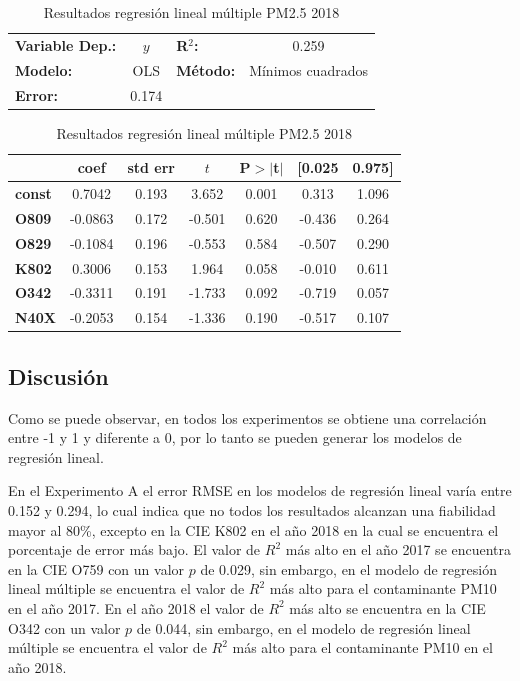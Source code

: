 \documentclass[3p,times]{elsarticle}
\begin{document}
\begin{table}[hbt!]
\caption{Resultados regresión lineal múltiple PM2.5 2018}
\label{tab:RRLM PM2.5 2018}
\begin{center}
\begin{tabular}{lclc}
\toprule
\textbf{Variable Dep.:}    &        $y$         & \textbf{  R$^2$:         } &     0.259   \\
\textbf{Modelo:}            &       OLS        & \textbf{Método:}           &  Mínimos cuadrados   \\
\textbf{Error:}            & 0.174  \\
\bottomrule
\end{tabular}
\begin{tabular}{lcccccc}
               & \textbf{coef} & \textbf{std err} & \textbf{$t$} & \textbf{P$> |$t$|$} & \textbf{[0.025} & \textbf{0.975]}  \\
\midrule
\textbf{const} &       0.7042  &        0.193     &     3.652  &         0.001        &        0.313    &        1.096     \\
\textbf{O809}  &      -0.0863  &        0.172     &    -0.501  &         0.620        &       -0.436    &        0.264     \\
\textbf{O829}  &      -0.1084  &        0.196     &    -0.553  &         0.584        &       -0.507    &        0.290     \\
\textbf{K802}  &       0.3006  &        0.153     &     1.964  &         0.058        &       -0.010    &        0.611     \\
\textbf{O342}  &      -0.3311  &        0.191     &    -1.733  &         0.092        &       -0.719    &        0.057     \\
\textbf{N40X}  &      -0.2053  &        0.154     &    -1.336  &         0.190        &       -0.517    &        0.107     \\
\bottomrule
\end{tabular}
\end{center}
\end{table}

\clearpage
\subsection{Discusión}

Como se puede observar, en todos los experimentos se obtiene una correlación entre -1 y 1 y diferente a 0, por lo tanto se pueden generar los modelos de regresión lineal.

En el Experimento A el error RMSE en los modelos de regresión lineal varía entre 0.152 y 0.294, lo cual indica que no todos los resultados alcanzan una fiabilidad mayor al 80\%, excepto en la CIE K802 en el año 2018 en la cual se encuentra el porcentaje de error más bajo. 
El valor de $R^2$ más alto en el año 2017 se encuentra en la CIE O759 con un valor $p$ de 0.029, sin embargo, en el modelo de regresión lineal múltiple se encuentra el valor de $R^2$ más alto para el contaminante PM10 en el año 2017. En el año 2018 el valor de $R^2$ más alto se encuentra en la CIE O342 con un valor $p$ de 0.044, sin embargo, en el modelo de regresión lineal múltiple se encuentra el valor de $R^2$ más alto para el contaminante PM10 en el año 2018.
\end{document}
